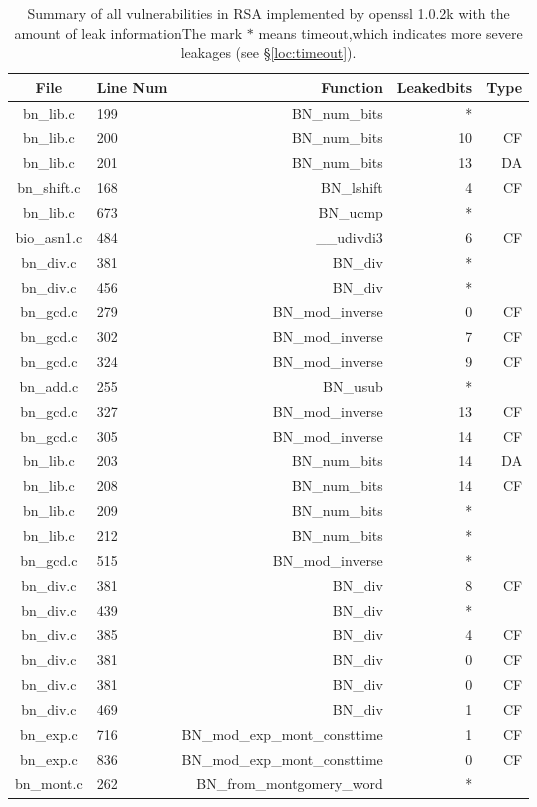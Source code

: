\begin{table*}%
\centering
\caption{Summary of all vulnerabilities in RSA implemented by openssl 1.0.2k with the amount of leak informationThe mark $*$ means timeout,which indicates more severe leakages (see \S\ref{loc:timeout}).}\label{tab:RSAopenssl}
\begin{tabular}{clrrr}
\hline
\textbf{File} & \textbf{Line Num} & \textbf{Function} & \textbf{Leakedbits} & \textbf{Type} \\\hline
bn\_lib.c&199&BN\_num\_bits&*&\\
bn\_lib.c&200&BN\_num\_bits&10&CF\\
bn\_lib.c&201&BN\_num\_bits&13&DA\\
bn\_shift.c&168&BN\_lshift&4 &CF\\
bn\_lib.c&673&BN\_ucmp&*&\\
bio\_asn1.c&484&\_\_udivdi3&6 &CF\\
bn\_div.c&381&BN\_div&*&\\
bn\_div.c&456&BN\_div&*&\\
bn\_gcd.c&279&BN\_mod\_inverse&0 &CF\\
bn\_gcd.c&302&BN\_mod\_inverse&7 &CF\\
bn\_gcd.c&324&BN\_mod\_inverse&9 &CF\\
bn\_add.c&255&BN\_usub&*&\\
bn\_gcd.c&327&BN\_mod\_inverse&13&CF\\
bn\_gcd.c&305&BN\_mod\_inverse&14&CF\\
bn\_lib.c&203&BN\_num\_bits&14&DA\\
bn\_lib.c&208&BN\_num\_bits&14&CF\\
bn\_lib.c&209&BN\_num\_bits&*&\\
bn\_lib.c&212&BN\_num\_bits&*&\\
bn\_gcd.c&515&BN\_mod\_inverse&*&\\
bn\_div.c&381&BN\_div&8 &CF\\
bn\_div.c&439&BN\_div&*&\\
bn\_div.c&385&BN\_div&4 &CF\\
bn\_div.c&381&BN\_div&0 &CF\\
bn\_div.c&381&BN\_div&0 &CF\\
bn\_div.c&469&BN\_div&1 &CF\\
bn\_exp.c&716&BN\_mod\_exp\_mont\_consttime&1 &CF\\
bn\_exp.c&836&BN\_mod\_exp\_mont\_consttime&0 &CF\\
bn\_mont.c&262&BN\_from\_montgomery\_word&*&\\

\end{tabular}
\end{table*}
